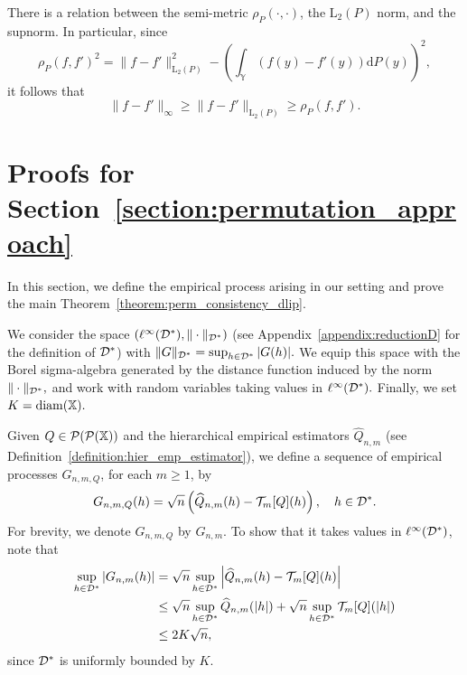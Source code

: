 \begin{remark}\label{remark::seminorm_l_2_supnorm}
There is a relation between the semi-metric $\rho_P(\cdot, \cdot)$, the $\mathrm{L}_2(P)$ norm, and the supnorm. In particular, since
\[
\rho_P(f,f')^2 = \|f - f'\|_{\mathrm{L}_2(P)}^2 - \left(\int_{\mathbb{Y}}\left(f(y) - f'(y) \right)\mathrm{d}P(y) \right)^2,
\]
it follows that
\[
\|f-f'\|_\infty \geq \|f - f'\|_{\mathrm{L}_2(P)} \geq \rho_P(f,f').
\]
\end{remark}





\section{Proofs for Section~\ref{section:permutation_approach}}\label{section:proofs_for_permutation_section}
In this section, we define the empirical process arising in our setting and prove the main Theorem~\ref{theorem:perm_consistency_dlip}.

We consider the space $(\ell^\infty(\mathcal{D}^*), \| \cdot \|_{\mathcal{D}^*})$ (see Appendix~\ref{appendix:reductionD} for the definition of $\mathcal{D}^*$) with $\|G\|_{\mathcal{D}^*} = \sup_{h \in \mathcal{D}^*} |G(h)|.$ We equip this space with the Borel sigma-algebra generated by the distance function induced by the norm $\| \cdot \|_{\mathcal{D}^*},$ and work with random variables taking values in $\ell^\infty(\mathcal{D}^*).$ Finally, we set $K = \operatorname{diam}(\mathbb{X}).$

Given $Q \in \mathcal{P}(\mathcal{P}(\mathbb{X}))$ and the hierarchical empirical estimators $\widehat{Q}_{n,m}$ (see Definition~\ref{definition:hier_emp_estimator}), we define a sequence of empirical processes $G_{n,m,Q}$, for each $m \geq 1$, by
\[
G_{n,m,Q}(h) = \sqrt{n} \left( \widehat{Q}_{n,m}(h) - \mathcal{T}_m[Q](h)\right), \quad h \in \mathcal{D}^*.
\]
For brevity, we denote $G_{n,m,Q}$ by $G_{n,m}$. To show that it takes values in $\ell^\infty(\mathcal{D}^*)$, note that
\begin{align*}
\sup_{h \in \mathcal{D}^*} \left|G_{n,m}(h)\right|  & = \sqrt{n} \sup_{h \in \mathcal{D}^*} \left| \widehat{Q}_{n,m}(h) - \mathcal{T}_m[Q](h)\right| \\
& \leq  \sqrt{n} \sup_{h \in \mathcal{D}^*} \widehat{Q}_{n,m}(|h|) + \sqrt{n} \sup_{h \in \mathcal{D}^*} \mathcal{T}_m[Q](|h|) \\
& \leq 2K\sqrt{n},
\end{align*}
since $\mathcal{D}^*$ is uniformly bounded by $K.$



